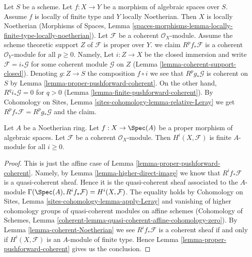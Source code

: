 \begin{remark}
\label{remark-scheme-theoretic-support-proper}
Let $S$ be a scheme. Let $f : X \to Y$ be a morphism of algebraic spaces
over $S$. Assume $f$ is locally of finite type and $Y$ locally Noetherian.
Then $X$ is locally Noetherian
(Morphisms of Spaces, Lemma
\ref{spaces-morphisms-lemma-locally-finite-type-locally-noetherian}).
Let $\mathcal{F}$ be a coherent $\mathcal{O}_X$-module.
Assume the scheme theoretic support $Z$ of $\mathcal{F}$
is proper over $Y$. we claim $R^pf_*\mathcal{F}$ is a coherent
$\mathcal{O}_Y$-module for all $p \geq 0$.
Namely, Let $i : Z \to X$ be the closed immersion and write
$\mathcal{F} = i_*\mathcal{G}$ for some coherent module $\mathcal{G}$
on $Z$ (Lemma \ref{lemma-coherent-support-closed}).
Denoting $g : Z \to S$ the composition $f \circ i$ we see that
$R^pg_*\mathcal{G}$
is coherent on $S$ by Lemma \ref{lemma-proper-pushforward-coherent}.
On the other hand, $R^qi_*\mathcal{G} = 0$ for $q > 0$
(Lemma \ref{lemma-finite-pushforward-coherent}).
By Cohomology on Sites, Lemma \ref{sites-cohomology-lemma-relative-Leray}
we get $R^pf_*\mathcal{F} = R^pg_*\mathcal{G}$ and the
claim.
\end{remark}

\begin{lemma}
\label{lemma-proper-over-affine-cohomology-finite}
Let $A$ be a Noetherian ring.
Let $f : X \to \Spec(A)$ be a proper morphism of algebraic spaces.
Let $\mathcal{F}$ be a coherent $\mathcal{O}_X$-module.
Then $H^i(X, \mathcal{F})$ is finite $A$-module for all $i \geq 0$.
\end{lemma}

\begin{proof}
This is just the affine case of Lemma \ref{lemma-proper-pushforward-coherent}.
Namely, by Lemma \ref{lemma-higher-direct-image} we know that
$R^if_*\mathcal{F}$ is a quasi-coherent sheaf. Hence it is the quasi-coherent
sheaf associated to the $A$-module
$\Gamma(\Spec(A), R^if_*\mathcal{F}) = H^i(X, \mathcal{F})$.
The equality holds by
Cohomology on Sites, Lemma \ref{sites-cohomology-lemma-apply-Leray}
and vanishing of higher cohomology groups of quasi-coherent modules
on affine schemes (Cohomology of Schemes, Lemma
\ref{coherent-lemma-quasi-coherent-affine-cohomology-zero}).
By Lemma \ref{lemma-coherent-Noetherian} we see $R^if_*\mathcal{F}$ is
a coherent sheaf if and only if $H^i(X, \mathcal{F})$
is an $A$-module of finite type. Hence
Lemma \ref{lemma-proper-pushforward-coherent} gives us the conclusion.
\end{proof}

